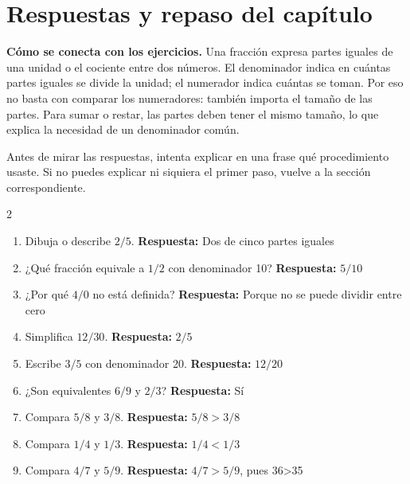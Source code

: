 \documentclass[10pt,oneside,openany]{book}
\begin{document}
\section{Respuestas y repaso del capítulo}

\textbf{Cómo se conecta con los ejercicios.} Una fracción expresa partes iguales de una unidad o el cociente entre dos números. El denominador indica en cuántas partes iguales se divide la unidad; el numerador indica cuántas se toman. Por eso no basta con comparar los numeradores: también importa el tamaño de las partes. Para sumar o restar, las partes deben tener el mismo tamaño, lo que explica la necesidad de un denominador común.

Antes de mirar las respuestas, intenta explicar en una frase qué procedimiento usaste. Si no puedes explicar ni siquiera el primer paso, vuelve a la sección correspondiente.

\begin{multicols}{2}\begin{enumerate}

\item Dibuja o describe $2/5$. \textbf{Respuesta:} Dos de cinco partes iguales

\item ¿Qué fracción equivale a $1/2$ con denominador 10? \textbf{Respuesta:} $5/10$

\item ¿Por qué $4/0$ no está definida? \textbf{Respuesta:} Porque no se puede dividir entre cero

\item Simplifica $12/30$. \textbf{Respuesta:} $2/5$

\item Escribe $3/5$ con denominador 20. \textbf{Respuesta:} $12/20$

\item ¿Son equivalentes $6/9$ y $2/3$? \textbf{Respuesta:} Sí

\item Compara $5/8$ y $3/8$. \textbf{Respuesta:} $5/8>3/8$

\item Compara $1/4$ y $1/3$. \textbf{Respuesta:} $1/4<1/3$

\item Compara $4/7$ y $5/9$. \textbf{Respuesta:} $4/7>5/9$, pues 36>35

\end{enumerate}\end{multicols}
\end{document}

